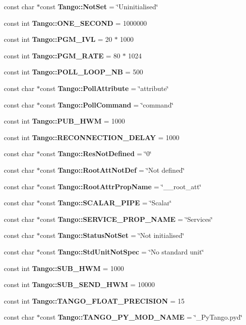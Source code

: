 \begin{DoxyCompactItemize}
\item 
const char $\ast$const {\bf Tango\-::\-Not\-Set} = \char`\"{}Uninitialised\char`\"{}
\item 
const int {\bf Tango\-::\-O\-N\-E\-\_\-\-S\-E\-C\-O\-N\-D} = 1000000
\item 
const int {\bf Tango\-::\-P\-G\-M\-\_\-\-I\-V\-L} = 20 $\ast$ 1000
\item 
const int {\bf Tango\-::\-P\-G\-M\-\_\-\-R\-A\-T\-E} = 80 $\ast$ 1024
\item 
const int {\bf Tango\-::\-P\-O\-L\-L\-\_\-\-L\-O\-O\-P\-\_\-\-N\-B} = 500
\item 
const char $\ast$const {\bf Tango\-::\-Poll\-Attribute} = \char`\"{}attribute\char`\"{}
\item 
const char $\ast$const {\bf Tango\-::\-Poll\-Command} = \char`\"{}command\char`\"{}
\item 
const int {\bf Tango\-::\-P\-U\-B\-\_\-\-H\-W\-M} = 1000
\item 
const int {\bf Tango\-::\-R\-E\-C\-O\-N\-N\-E\-C\-T\-I\-O\-N\-\_\-\-D\-E\-L\-A\-Y} = 1000
\item 
const char $\ast$const {\bf Tango\-::\-Res\-Not\-Defined} = \char`\"{}0\char`\"{}
\item 
const char $\ast$const {\bf Tango\-::\-Root\-Att\-Not\-Def} = \char`\"{}Not defined\char`\"{}
\item 
const char $\ast$const {\bf Tango\-::\-Root\-Attr\-Prop\-Name} = \char`\"{}\-\_\-\-\_\-root\-\_\-att\char`\"{}
\item 
const char $\ast$const {\bf Tango\-::\-S\-C\-A\-L\-A\-R\-\_\-\-P\-I\-P\-E} = \char`\"{}Scalar\char`\"{}
\item 
const char $\ast$const {\bf Tango\-::\-S\-E\-R\-V\-I\-C\-E\-\_\-\-P\-R\-O\-P\-\_\-\-N\-A\-M\-E} = \char`\"{}Services\char`\"{}
\item 
const char $\ast$const {\bf Tango\-::\-Status\-Not\-Set} = \char`\"{}Not initialised\char`\"{}
\item 
const char $\ast$const {\bf Tango\-::\-Std\-Unit\-Not\-Spec} = \char`\"{}No standard unit\char`\"{}
\item 
const int {\bf Tango\-::\-S\-U\-B\-\_\-\-H\-W\-M} = 1000
\item 
const int {\bf Tango\-::\-S\-U\-B\-\_\-\-S\-E\-N\-D\-\_\-\-H\-W\-M} = 10000
\item 
const int {\bf Tango\-::\-T\-A\-N\-G\-O\-\_\-\-F\-L\-O\-A\-T\-\_\-\-P\-R\-E\-C\-I\-S\-I\-O\-N} = 15
\item 
const char $\ast$const {\bf Tango\-::\-T\-A\-N\-G\-O\-\_\-\-P\-Y\-\_\-\-M\-O\-D\-\_\-\-N\-A\-M\-E} = \char`\"{}\-\_\-\-Py\-Tango.\-pyd\char`\"{}

\end{DoxyCompactItemize}
